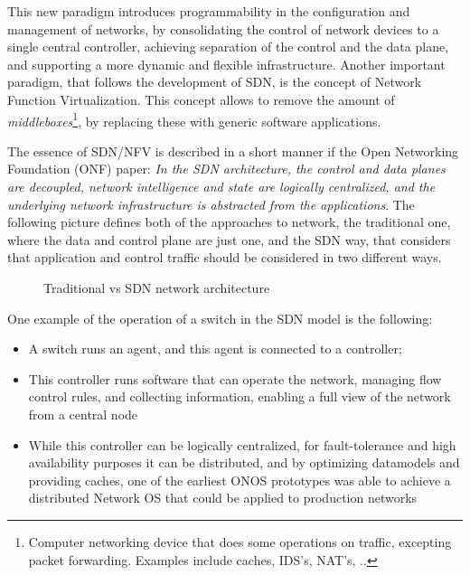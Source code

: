 \par This new paradigm introduces programmability in the configuration and management of networks, by consolidating the control of network devices to a single central controller, achieving separation of the control and the 
data plane, and supporting a more dynamic and flexible infrastructure. Another important paradigm, that follows the development of SDN, is the concept of Network Function Virtualization. This concept allows to remove the amount of 
        \textit {middleboxes}\footnote {Computer networking device that does some operations on traffic, excepting packet forwarding. Examples include caches, IDS's, NAT's, ..}, by replacing these with generic software 
applications.

\par The essence of SDN/NFV is described in a short manner if the Open Networking Foundation (ONF) paper: \textit{ In the SDN architecture, the control and data planes are decoupled,  network intelligence and state are 
logically centralized, and the underlying network infrastructure is abstracted from the applications}. The following picture defines both of the approaches to network, the traditional one, where the data and control plane
are just one, and the SDN way, that considers that application and control traffic should be considered in two different ways. 

\begin{figure}[!tbph]
  \centering
  \hfill
  \caption {Traditional vs SDN network architecture}
\end{figure}

\pagebreak

\par One example of the operation of a switch in the SDN model is the following:

\begin {itemize} 
    \item A switch runs an agent, and this agent is connected to a controller;
    \item This controller runs software that can operate the network, managing flow control rules, and collecting information, enabling a full view of the network from a central node
    \item While this controller can be logically centralized, for fault-tolerance and high availability purposes it can be distributed, and by optimizing datamodels and providing caches, one of the earliest ONOS prototypes was
able to achieve a distributed Network OS that could be applied to production networks \cite {berde_onos:_2014}
\end {itemize}

